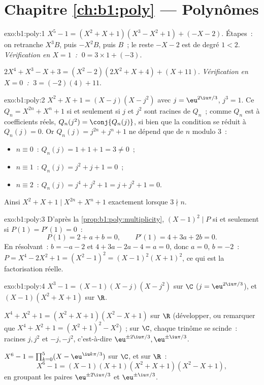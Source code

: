 \section*{Chapitre \ref{ch:b1:poly} --- Polynômes}

\begin{solution}{exo:b1:poly:1}
$X^5 - 1 = (X^2 + X + 1)(X^3 - X^2 + 1) + (-X - 2)$. Étapes~: on
retranche $X^3 B$, puis $-X^2 B$, puis $B$~; le reste $-X - 2$ est de
degré $1 < 2$. \emph{Vérification en $X = 1$~:} $\;0 = 3 \times 1 +
(-3)$.

$2X^4 + X^3 - X + 3 = (X^2 - 2)(2X^2 + X + 4) + (X + 11)$.
\emph{Vérification en $X = 0$~:} $\;3 = (-2)(4) + 11$.
\end{solution}

\begin{solution}{exo:b1:poly:2}
$X^2 + X + 1 = (X - j)(X - j^2)$ avec $j = \eu^{2\iu\pi/3}$, $j^3 =
1$. Ce   $Q_n = X^{2n} + X^n + 1$ si et seulement si $j$
et $j^2$ sont racines de $Q_n$~; comme $Q_n$ est à coefficients réels,
$Q_n(j^2) = \conj{Q_n(j)}$, si bien que la condition se réduit à
$Q_n(j) = 0$. Or $Q_n(j) = j^{2n} + j^n + 1$ ne dépend que de $n$
modulo $3$~:
\begin{itemize}
  \item $n \equiv 0$~: $Q_n(j) = 1 + 1 + 1 = 3 \neq 0$~;
  \item $n \equiv 1$~: $Q_n(j) = j^2 + j + 1 = 0$~;
  \item $n \equiv 2$~: $Q_n(j) = j^4 + j^2 + 1 = j + j^2 + 1 = 0$.
\end{itemize}
Ainsi $X^2 + X + 1 \mid X^{2n} + X^n + 1$ exactement lorsque $3 \nmid
n$.
\end{solution}

\begin{solution}{exo:b1:poly:3}
D'après la \cref{prop:b1:poly:multiplicity}, $(X-1)^2 \mid P$ si et
seulement si $P(1) = P'(1) = 0$~:
\[
P(1) = 2 + a + b = 0, \qquad P'(1) = 4 + 3a + 2b = 0 .
\]
En résolvant~: $b = -a - 2$ et $4 + 3a - 2a - 4 = a = 0$, donc $a = 0$,
$b = -2$~: $P = X^4 - 2X^2 + 1 = (X^2 - 1)^2 = (X-1)^2 (X+1)^2$, ce qui
est la factorisation réelle.
\end{solution}

\begin{solution}{exo:b1:poly:4}
$X^3 - 1 = (X - 1)(X - j)(X - j^2)$ sur $\C$ ($j = \eu^{2\iu\pi/3}$),
et $(X - 1)(X^2 + X + 1)$ sur $\R$.

$X^4 + X^2 + 1 = (X^2 + X + 1)(X^2 - X + 1)$ sur $\R$ (développer, ou
remarquer que $X^4 + X^2 + 1 = (X^2+1)^2 - X^2$)~; sur $\C$, chaque
trinôme se scinde~: racines $j, j^2$ et $-j, -j^2$, c'est-à-dire
$\eu^{\pm 2\iu\pi/3}, \eu^{\pm\iu\pi/3}$.

$X^6 - 1 = \prod_{k=0}^{5} (X - \eu^{\iu k\pi/3})$ sur $\C$, et sur
$\R$~:
\[
X^6 - 1 = (X-1)(X+1)(X^2 + X + 1)(X^2 - X + 1),
\]
en groupant les paires  $\eu^{\pm 2\iu\pi/3}$ et $\eu^{\pm
\iu\pi/3}$.
\end{solution}

